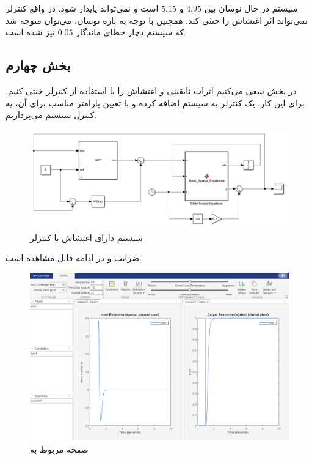 \documentclass[14pt, a4paper]{extarticle}
\begin{document}
سیستم در حال نوسان بین 
$4.95$
و 
$5.15$
است و نمی‌تواند پایدار شود. در واقع کنترلر نمی‌تواند اثر اغتشاش را خنثی کند. همچنین با توجه به بازه نوسان،‌ می‌توان متوجه شد که سیستم دچار خطای ماندگار 
$0.05$
نیز شده است.

\newpage
\subsection{بخش چهارم}

 در بخش سعی می‌کنیم اثرات نایقینی و اغتشاش را با استفاده از کنترلر 
 خنثی کنیم. برای این کار، یک کنترلر 
 به سیستم اضافه کرده و با تعیین پارامتر مناسب برای آن، یه کنترل سیستم می‌پردازیم.
 \begin{figure}[h!]
 	\centering
 	\includegraphics[scale = 0.47]{Q1_4_sim.png}
 	\caption{سیستم دارای اغتشاش با کنترلر 
 		}
 \end{figure}
 ضرایب 
 و
 در ادامه قابل مشاهده است.
 \begin{figure}[h!]
 	\centering
 	\includegraphics[scale = 0.5]{Q1_4_mpc.png}
 	\caption{صفحه مربوط به 
 		}
 \end{figure}
 
 \newpage
 
\end{document}
